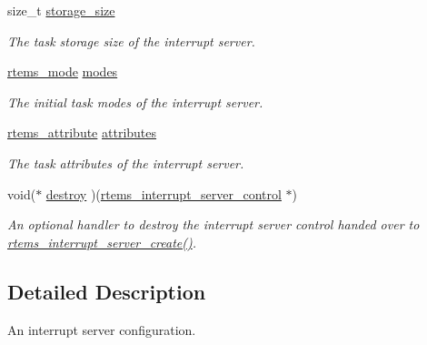 \begin{DoxyCompactItemize}
size\+\_\+t \mbox{\hyperlink{structrtems__interrupt__server__config_a0c0a50c42b73f1582d43b941e2cf1168}{storage\+\_\+size}}
\begin{DoxyCompactList}\small\item\em The task storage size of the interrupt server. \end{DoxyCompactList}\item 
\mbox{\label{structrtems__interrupt__server__config_a2408931847469630b3691e11b0d901b1}} 
\mbox{\hyperlink{group__ClassicModes_ga8d46a41a837840dc97336fdcd20e4f68}{rtems\+\_\+mode}} \mbox{\hyperlink{structrtems__interrupt__server__config_a2408931847469630b3691e11b0d901b1}{modes}}
\begin{DoxyCompactList}\small\item\em The initial task modes of the interrupt server. \end{DoxyCompactList}\item 
\mbox{\label{structrtems__interrupt__server__config_a6066463b74184ce38c1f714f9a1fdc4b}} 
\mbox{\hyperlink{group__ClassicAttributes_gaea40313cf78ed843e09c4315d0a10f79}{rtems\+\_\+attribute}} \mbox{\hyperlink{structrtems__interrupt__server__config_a6066463b74184ce38c1f714f9a1fdc4b}{attributes}}
\begin{DoxyCompactList}\small\item\em The task attributes of the interrupt server. \end{DoxyCompactList}\item 
void($\ast$ \mbox{\hyperlink{structrtems__interrupt__server__config_a3d26283a8aad002ccb982b4031db3ec2}{destroy}} )(\mbox{\hyperlink{structrtems__interrupt__server__control}{rtems\+\_\+interrupt\+\_\+server\+\_\+control}} $\ast$)
\begin{DoxyCompactList}\small\item\em An optional handler to destroy the interrupt server control handed over to \mbox{\hyperlink{group__rtems__interrupt__extension_gad7725dd729bfd34f36c0de4d9c326abc}{rtems\+\_\+interrupt\+\_\+server\+\_\+create()}}. \end{DoxyCompactList}\end{DoxyCompactItemize}


\subsection{Detailed Description}
An interrupt server configuration. 

